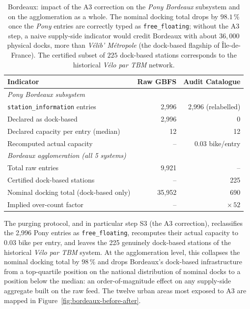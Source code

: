 \documentclass[11pt,a4paper]{article}
\begin{document}
\begin{table}[!htbp]
\centering
\caption{Bordeaux: impact of the A3 correction on the
\emph{Pony Bordeaux} subsystem and on the agglomeration as a whole.
The nominal docking total drops by $98.1\,\%$ once the
\emph{Pony} entries are correctly typed as
\texttt{free\_floating}; without the A3 step, a naive supply-side
indicator would credit Bordeaux with about $36{,}000$ physical
docks, more than \emph{V\'elib' M\'etropole} (the dock-based
flagship of \^Ile-de-France). The certified subset of $225$
dock-based stations corresponds to the historical
\emph{V\'elo par TBM} network.}
\label{tab:bordeaux}
\small
\begin{tabular}{@{}lrr@{}}
\toprule
\textbf{Indicator} & \textbf{Raw GBFS} & \textbf{Audit Catalogue}\\
\midrule
\textit{Pony Bordeaux subsystem} & & \\
\quad \texttt{station\_information} entries & 2{,}996 & 2{,}996 (relabelled) \\
\quad Declared as dock-based                 & 2{,}996 & 0 \\
\quad Declared capacity per entry (median)   & 12      & 12 \\
\quad Recomputed actual capacity             & --      & 0.03 bike/entry \\
\midrule
\textit{Bordeaux agglomeration (all 5 systems)} & & \\
\quad Total raw entries                      & 9{,}921 & -- \\
\quad Certified dock-based stations           & --      & 225 \\
\quad Nominal docking total (dock-based only) & 35{,}952 & 690 \\
\quad Implied over-count factor               & --       & $\times\,52$ \\
\bottomrule
\end{tabular}
\end{table}

The purging protocol, and in particular step S3 (the A3 correction),
reclassifies the 2{,}996 Pony entries as \texttt{free\_floating},
recomputes their actual capacity to 0.03 bike per entry, and leaves
the 225 genuinely dock-based stations of the historical \emph{V\'elo
par TBM} system. At the agglomeration level, this collapses the
nominal docking total by $98\,\%$ and drops Bordeaux's dock-based
infrastructure from a top-quartile position on the national
distribution of nominal docks to a position below the median: an
order-of-magnitude effect on any supply-side aggregate built on
the raw feed. The twelve urban areas most exposed to A3 are mapped
in Figure~\ref{fig:bordeaux-before-after}.
\end{document}
